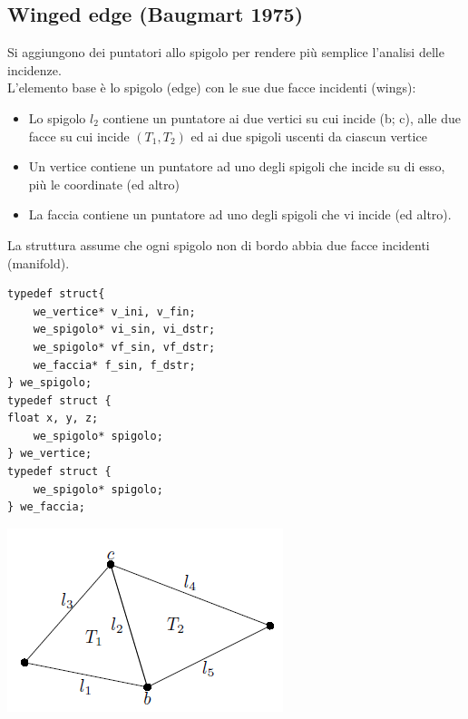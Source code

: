\documentclass[a4paper, 10pt]{article}
\begin{document}
	\subsection{Winged edge (Baugmart 1975)}
		Si aggiungono dei puntatori allo spigolo per
		rendere più semplice l’analisi delle incidenze.\\
		L’elemento base è lo spigolo (edge) con le sue due facce incidenti (wings):
		\begin{itemize}
			\item Lo spigolo $ l_2 $ contiene un puntatore ai due
			vertici su cui incide (b; c), alle due facce su cui
			incide $ (T_1, T_2) $ ed ai due spigoli uscenti da
			ciascun vertice
			\item Un vertice contiene un puntatore ad uno degli
			spigoli che incide su di esso, più le coordinate
			(ed altro)
			\item La faccia contiene un puntatore ad uno degli
			spigoli che vi incide (ed altro).
		\end{itemize}
		La struttura assume che ogni spigolo non di
		bordo abbia due facce incidenti (manifold).
		
		\begin{multicols}{2}
		\begin{lstlisting}
typedef	struct{
	we_vertice* v_ini, v_fin;
	we_spigolo* vi_sin, vi_dstr;
	we_spigolo* vf_sin, vf_dstr;
	we_faccia* f_sin, f_dstr;
} we_spigolo;
typedef struct {
float x, y, z;
	we_spigolo* spigolo;
} we_vertice;
typedef struct {
	we_spigolo* spigolo;
} we_faccia;
		\end{lstlisting}
		
		\columnbreak
		
		\vspace*{1cm}
			\includegraphics[scale=0.5]{mesh1}
		\end{multicols}
		
\end{document}
